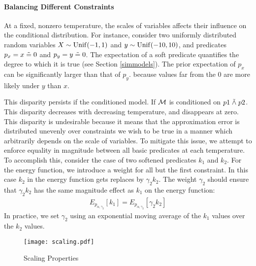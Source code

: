 \paragraph{Balancing Different Constraints}
At a fixed, nonzero temperature, the scales of variables affects their influence on
the conditional distribution.
For instance, consider two uniformly distributed random variables $X \sim \operatorname{Unif}(-1, 1)$ and $y \sim \operatorname{Unif}(-10, 10)$,
and predicates $p_x = x \mathrel{\tilde{=}} 0$ and $p_y = y \mathrel{\tilde{=}} 0$.
The expectation of a soft predicate quantifies the degree to which it is true (see Section \ref{simmodels}).
The prior expectation of $p_x$ can be significantly larger than that of $p_y$.
because values far from the 0 are more likely under $y$ than $x$.

This disparity persists if the conditioned model.
If ${\mathcal{M}}$ is conditioned on $p1 \mathrel{\tilde{\land}} p2$.
This disparity  decreases with decreasing temperature, and disappears at zero.
This disparity is undesirable because it means that the approximation error is distributed unevenly over constraints we wish to be true in a manner which arbitrarily depends on the scale of variables.
To mitigate this issue, we attempt to enforce equality
in magnitude between all basic predicates at each temperature.
To accomplish this, consider the case of two 
softened predicates $k_1$ and $k_2$. For the
energy function, we introduce a weight
for all but the first constraint.
In this case $k_2$ in the energy function gets replaces
by $\gamma_2 k_2$. The weight $\gamma_2$ should
ensure that $\gamma_2 k_2$ has the same
magnitude effect as $k_1$ on the energy
function:
\begin{align*}
E_{p_{\alpha, \gamma_2}}[k_1] = E_{p_{\alpha, \gamma_2}}[\gamma_2 k_2] 
\end{align*}
In practice, we set $\gamma_2$ using an exponential moving
average of the $k_1$ values over the $k_2$ values.


\begin{figure}
  \centering
  \texttt{[image: scaling.pdf]}
  \caption{Scaling Properties}\label{scaling}
  \end{figure}

